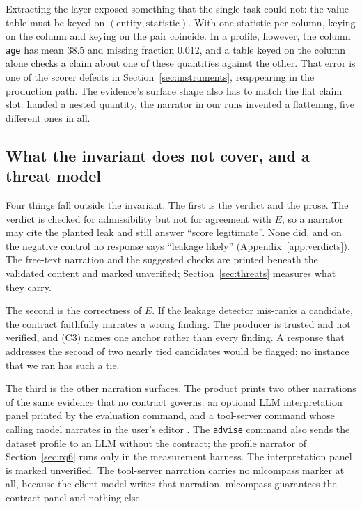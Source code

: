 \documentclass[10pt,twocolumn]{article}
\begin{document}
Extracting the layer exposed something that the single task could not: the
value table must be keyed on $(\text{entity}, \text{statistic})$. With one
statistic per column, keying on the column and keying on the pair coincide. In a profile, however, the
column \texttt{age} has mean 38.5 and missing fraction 0.012, and a table
keyed on the column alone checks a claim about one of these quantities against
the other. That error is one of the scorer defects in
Section~\ref{sec:instruments}, reappearing in the production path. The
evidence's surface shape also has to match the flat claim slot: handed a
nested quantity, the narrator in our runs invented a flattening, five
different ones in all.

\subsection{What the invariant does not cover, and a threat model}

Four things fall outside the invariant. The first is the verdict and the
prose. The verdict is checked for admissibility but not for agreement with
$E$, so a narrator may cite the planted leak and still answer ``score
legitimate''. None did, and on the negative control no response says
``leakage likely'' (Appendix~\ref{app:verdicts}). 
The free-text narration and the suggested checks are printed beneath the
validated content and marked unverified; Section~\ref{sec:threats} measures
what they carry.

The second is the correctness of $E$. If the leakage detector mis-ranks a
candidate, the contract faithfully narrates a wrong finding. The producer is
trusted and not verified, and (C3) names one anchor rather than every
finding. A response that addresses the second of two nearly tied candidates
would be flagged; no instance that we ran has such a tie.

The third is the other narration surfaces. The product prints two other
narrations of the same evidence that no contract governs: an optional LLM
interpretation panel printed by the evaluation command, and a tool-server
command whose calling model narrates in the user's editor \citep{mcp}. The
\texttt{advise} command also sends the dataset profile to an LLM without the
contract; the profile narrator of Section~\ref{sec:rq6} runs only in the
measurement harness. The
interpretation panel is marked unverified. The tool-server narration carries
no mlcompass marker at all, because the client model writes that narration.
mlcompass guarantees the contract panel and nothing else.
\end{document}
